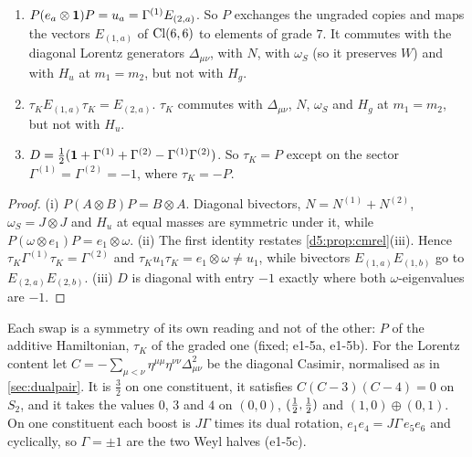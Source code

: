 \begin{proposition}
\label{e1:prop:swap}
\begin{enumerate}[label=(\roman*),leftmargin=2.2em]
\item $P(e_a\otimes\mathbf 1)P=u_a=\Gamma^{(1)}E_{(2,a)}$. So $P$ exchanges the ungraded copies and maps the vectors $E_{(1,a)}$ of $\mathrm{Cl}(6,6)$ to elements of
grade $7$. It commutes with the diagonal Lorentz generators $\Delta_{\mu\nu}$, with $N$, with $\omega_S$ (so it preserves $W$) and with $H_u$ at
$m_1=m_2$, but not with $H_g$.
\item $\tau_KE_{(1,a)}\tau_K=E_{(2,a)}$. $\tau_K$ commutes with $\Delta_{\mu\nu}$, $N$, $\omega_S$ and $H_g$ at $m_1=m_2$, but not with $H_u$.
\item $D=\tfrac12(\mathbf 1+\Gamma^{(1)}+\Gamma^{(2)}-\Gamma^{(1)}\Gamma^{(2)})$. So $\tau_K=P$ except on the sector $\Gamma^{(1)}=\Gamma^{(2)}=-1$, where $\tau_K=-P$.
\end{enumerate}
\end{proposition}

\begin{proof}
(i) $P(A\otimes B)P=B\otimes A$. Diagonal bivectors, $N=N^{(1)}+N^{(2)}$, $\omega_S=J\otimes J$ and $H_u$ at equal masses are symmetric under it,
while $P(\omega\otimes e_1)P=e_1\otimes\omega$. (ii) The first identity restates \cref{d5:prop:cmrel}(iii). Hence
$\tau_K\Gamma^{(1)}\tau_K=\Gamma^{(2)}$ and $\tau_Ku_1\tau_K=e_1\otimes\omega\neq u_1$, while bivectors $E_{(1,a)}E_{(1,b)}$ go to $E_{(2,a)}E_{(2,b)}$. (iii) $D$ is
diagonal with entry $-1$ exactly where both $\omega$-eigenvalues are $-1$.
\end{proof}

Each swap is a symmetry of its own reading and not of the other: $P$ of the additive Hamiltonian, $\tau_K$ of the graded one (fixed; e1-5a,
e1-5b). For the Lorentz content let $C=-\sum_{\mu<\nu}\eta^{\mu\mu}\eta^{\nu\nu}\Delta_{\mu\nu}^2$ be the diagonal Casimir, normalised as in \cref{sec:dualpair}. It is $\tfrac32$ on one constituent, it satisfies $C(C-3)(C-4)=0$ on $S_2$, and it takes the values $0$, $3$ and $4$ on
$(0,0)$, $(\tfrac12,\tfrac12)$ and $(1,0)\oplus(0,1)$. On one constituent each boost is $J\Gamma$ times its dual rotation,
$e_1e_4=J\Gamma\,e_5e_6$ and cyclically, so $\Gamma=\pm1$ are the two Weyl halves (e1-5c).

